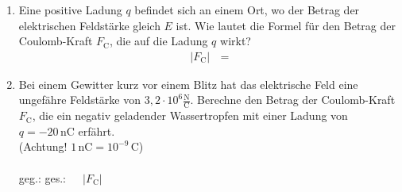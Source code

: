 \documentclass[task=1]{exercise}
\begin{document}
  \begin{enumerate}[label=\textnormal{\alph*)}]
    \item Eine positive Ladung $q$ befindet sich an einem Ort, wo der Betrag der elektrischen Feldst\"arke gleich $E$ ist. Wie lautet die Formel f\"ur den Betrag der Coulomb-Kraft $F_\mathrm{C}$, die auf die Ladung $q$ wirkt?
    \begin{align*}
      \left| F_\mathrm{C} \right| \, &=
    \end{align*}
    \item Bei einem Gewitter kurz vor einem Blitz hat das elektrische Feld eine ungef\"ahre Feldst\"arke von $3{,}2 \cdot 10^6 \frac{\mathrm{N}}{\mathrm{C}}$. Berechne den Betrag der Coulomb-Kraft $F_\mathrm{C}$, die ein negativ geladender Wassertropfen mit einer Ladung von $q = -20\,\mathrm{nC}$ erf\"ahrt.\\
    (Achtung! $1\,\mathrm{nC} = 10^{-9}\,\mathrm{C}$)\\~\\
    geg.:\hspace{7cm} ges.:~~~$\left| F_\mathrm{C} \right|$\\\vspace{1cm}
  \end{enumerate}

  
\end{document}
